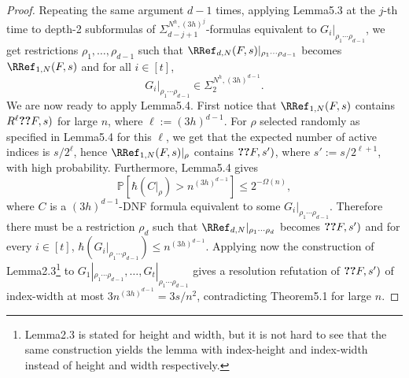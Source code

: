 \begin{proof}
Repeating the same argument $d-1$ times, applying Lemma5.3 at the $j$-th time to depth-2 subformulas of $\Sigma_{d-j+1}^{N^h,(3h)^j}$-formulas equivalent to $G_i|_{\rho_1\cdots\rho_{d-1}}$, we get restrictions $\rho_1,\ldots,\rho_{d-1}$ such that $\RRef_{d,N}(F,s)|_{\rho_1\cdots\rho_{d-1}}$ becomes $\RRef_{1,N}(F,s)$ and for all $i\in[t]$,
\[G_i|_{\rho_1\cdots\rho_{d-1}}\in\Sigma_2^{N^h,(3h)^{d-1}}.\]
We are now ready to apply Lemma5.4. First notice that $\RRef_{1,N}(F,s)$ contains $R^\ell\Ref(F,s)$ for large $n$, where $\ell:=(3h)^{d-1}$. For $\rho$ selected randomly as specified in Lemma5.4 for this $\ell$, we get that the expected number of active indices is $s/2^\ell$, hence $\RRef_{1,N}(F,s)|_\rho$ contains $\Ref(F,s')$, where $s':=s/2^{\ell+1}$, with high probability. Furthermore, Lemma5.4 gives
\[\mathbb P[\hbar(C|_\rho)>n^{(3h)^{d-1}}]\le2^{-\Omega(n)},\]
where $C$ is a $(3h)^{d-1}$-DNF formula equivalent to some $G_i|_{\rho_1\cdots\rho_{d-1}}$. Therefore there must be a restriction $\rho_d$ such that $\RRef_{d,N}|_{\rho_1\cdots\rho_d}$ becomes $\Ref(F,s')$ and for every $i\in[t]$, $\hbar(G_i|_{\rho_1\cdots\rho_{d-1}})\le n^{(3h)^{d-1}}$. Applying now the construction of Lemma2.3\footnote{Lemma2.3 is stated for height and width, but it is not hard to see that the same construction yields the lemma with index-height and index-width instead of height and width respectively.} to $G_1|_{\rho_1\cdots\rho_{d-1}},\ldots,G_t|_{\rho_1\cdots\rho_{d-1}}$ gives a resolution refutation of $\Ref(F,s')$ of index-width at most $3n^{(3h)^{d-1}}=3s/n^2$, contradicting Theorem5.1 for large $n$.
\end{proof}
